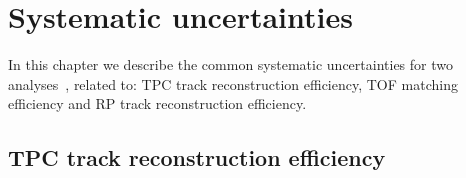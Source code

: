 

\chapter{Systematic uncertainties}\label{chap:systematicErrors}
In this chapter we describe the common systematic uncertainties for two analyses~\cite{AnalysisNoteRafal,AnalysisNoteLukasz}, related to: TPC track reconstruction efficiency, TOF matching efficiency and RP track reconstruction efficiency.
\section{TPC track reconstruction efficiency}\label{sec:tpcSystematics}
